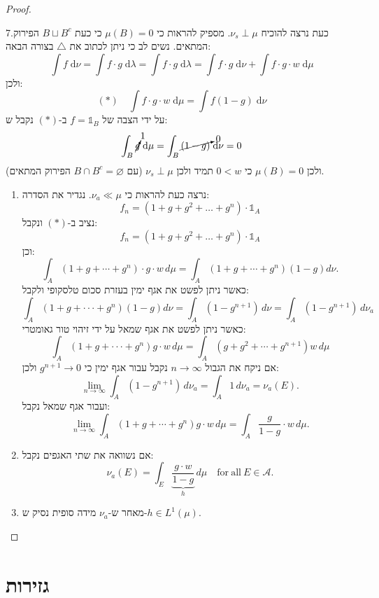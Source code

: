 \documentclass{tstextbook}
\begin{document}
\begin{proof}
\begin{enumerate}
  \end{enumerate}
7.כעת נרצה להוכיח \(\nu_{s}\perp \mu\). מספיק להראות כי \(\mu(B)=0\) כי כעת \(B \sqcup B^{c}\) הפירוק המתאים. נשים לב כי ניתן לכתוב את \(\triangle\) בצורה הבאה: 
$$\int f \;\mathrm{d} \nu =\int f\cdot g \;\mathrm{d} \lambda = \int f\cdot g \;\mathrm{d} \lambda = \int f\cdot g \;\mathrm{d} \nu+\int f\cdot g\cdot w \;\mathrm{d} \mu    $$
ולכן:
$$(*)\quad \int f\cdot g\cdot w \;\mathrm{d} \mu = \int f(1-g) \;\mathrm{d} \nu  $$
על ידי הצבה של \(f=\mathbb{1}_{B}\) ב-\((*)\) נקבל ש:
$$\int_{B} \cancelto{ 1 }{ g } \;\mathrm{d} \mu = \int_{B} \cancelto{ 0 }{ (1-g) } \;\mathrm{d} \nu  =0$$
ולכן \(\mu(B)=0\) כי \(0<w\) תמיד ולכן \(\nu_{s}\perp \mu\) (עם \(B\cap B^{c}=\varnothing\) הפירוק המתאים).

  \begin{enumerate}
    \item נרצה כעת להראות כי \(\nu_{a}\ll \mu\). נגדיר את הסדרה: 
$$f_{n}=\left( 1+g+g^{2}+\dots+ g^{n} \right)\cdot \mathbb{1} _{A}$$
נציב ב-\((*)\) ונקבל:
$$f_{n}=\left( 1+g+g^{2}+\dots+ g^{n} \right)\cdot \mathbb{1} _{A}$$
וכן:
$$\int_{A}\left(1+g+\cdots+g^{n}\right)\cdot g\cdot w\,d\mu=\int_{A}\left(1+g+\cdots+g^{n}\right)\left(1-g\right)d\nu.$$
כאשר ניתן לפשט את אגף ימין בעזרת סכום טלסקופי ולקבל:
$$\int_{A}\left(1+g+\cdot\cdot\cdot+g^{n}\right)\left(1-g\right)d\nu=\int_{A}\left(1-g^{n+1}\right)\,d\nu=\int_{A}\left(1-g^{n+1}\right)\,d\nu_{a}$$
כאשר ניתן לפשט את אגף שמאל על ידי זיהוי טור גאומטרי:
$$\int_{A}\left(1+g+\cdot\cdot\cdot+g^{n}\right)g\cdot w\,d\mu=\int_{A}\left(g+g^{2}+\cdots+g^{n+1}\right)w\,d\mu$$
אם ניקח את הגבול \(n\to \infty\) נקבל עבור אגף ימין כי \(g^{n+1}\to 0\) ולכן:
$$\operatorname*{lim}_{n\to\infty}\int_{A}\left(1-g^{n+1}\right)\,d\nu_{a}=\int_{A}1\,d\nu_{a}=\nu_{a}(E).$$
ועבור אגף שמאל נקבל:
$$\operatorname*{lim}_{n\to\infty}\int_{A}\left(1+g+\cdots+g^{n}\right)g\cdot w\,d\mu=\int_{A}{\frac{g}{1-g}}\cdot w\,d\mu.$$


    \item אם נשוואה את שתי האגפים נקבל: 
$$\nu_{a}(E)=\int_{E}\underbrace{\frac{g\cdot w}{1-g}}_{h}\,d\mu\quad\mathrm{for~all~}E\in\mathcal{A}.$$


    \item מאחר ש-\(\nu_{a}\) מידה סופית נסיק ש-\(h \in L^{1}\left( \mu \right)\). 


  \end{enumerate}
\end{proof}
\section{גזירות}
\end{document}
